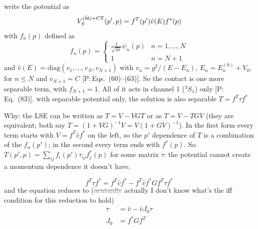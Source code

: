 \documentclass[11pt,a4paper]{article}
\newcommand{\tagP}[1]{\textcolor{blue!65!black}{\textsf{\small[P:\,#1]}}}
\newcommand{\ai}[1]{\textcolor{aicolor}{#1}}
\newcommand{\aifix}[2]{\textcolor{gray}{\sout{#1}} \textcolor{aicolor}{#2}}
\newcommand{\ai}[1]{#1}
\newcommand{\aifix}[2]{#2}
\newenvironment{aiadd}{\par}{\par}
\begin{document}
write the potential as
\[
	V_S^{(\bar b b) + \rm{CT}}(p',p) = f^T(p')\hat v (E) f^*(p)
\]
with $f_n(p)$ defined as
\[
	f_n(p) = \begin{cases}
		\frac{1}{\sqrt{4\pi}}\psi_n(p) & n = 1,\dots,N \\
		1                              & n = N+1
	\end{cases}
\]
\ai{and $\hat v(E)=\text{diag}(v_1,\dots,v_N,v_{N+1})$ with $v_n=g^2/(E-E_n)$, $E_n=E_n^{(0)}+V_0$, for $n\le N$ and $v_{N+1}=C$ \tagP{Eqs.~(60)--(63)}. So the contact is one more separable term, with $f_{N+1}=1$. All of it acts in channel 1 ($^3S_1$) only \tagP{Eq.~(83)}.}
with separable potential only, the solution is also separable $T = f^T \tau f^*$
\begin{aiadd}
	Why: the LSE can be written as $T=V-VGT$ or as $T=V-TGV$ (they are equivalent; both say $T=(1+VG)^{-1}V=V(1+GV)^{-1}$). In the first form every term starts with $V=f^T\hat vf^*$ on the left, so the $p'$ dependence of $T$ is a combination of the $f_n(p')$; in the second every term ends with $f^*(p)$. So $T(p',p)=\sum_{ij}f_i(p')\tau_{ij}f^*_j(p)$ for some matrix $\tau$: the potential cannot create a momentum dependence it doesn't have.
\end{aiadd}
\[
	f^T \tau f^* = f^T \hat v f^* - f^T \hat v f^* G f^T \tau f^*
\]
and the equation reduces to (\aifix{acutually}{actually} I don't know what's the iff condition for this reduction to hold)
\begin{align}
	\tau & = \hat v - \hat v J_0 \tau \\
	J_0  & = f^* G f^T
\end{align}
\end{document}
